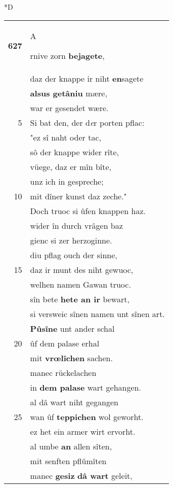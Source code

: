 \documentclass[8pt,a4paper,notitlepage]{article}
\begin{document}
\begin{table}[ht]
\begin{minipage}[t]{0.5\linewidth}
\small
\begin{center}*D
\end{center}
\begin{tabular}{rl}
\textbf{627} & \begin{large}A\end{large}rnive zorn \textbf{bejagete},\\ 
 & daz der knappe ir niht \textbf{en}sagete\\ 
 & \textbf{alsus getâniu} mære,\\ 
 & war er gesendet wære.\\ 
5 & Si bat den, der d\textit{e}r porten pflac:\\ 
 & "ez sî naht oder tac,\\ 
 & sô der knappe wider rîte,\\ 
 & vüege, daz er mîn bîte,\\ 
 & unz ich in gespreche;\\ 
10 & mit dîner kunst daz zeche."\\ 
 & Doch truoc si ûfen knappen haz.\\ 
 & wider în durch vrâgen baz\\ 
 & gienc si zer herzoginne.\\ 
 & diu pflag ouch der sinne,\\ 
15 & daz ir munt des niht gewuoc,\\ 
 & welhen namen Gawan truoc.\\ 
 & sîn bete \textbf{hete an ir} bewart,\\ 
 & si versweic sînen namen unt sînen art.\\ 
 & \textbf{Pûsîne} unt ander schal\\ 
20 & ûf dem palase erhal\\ 
 & mit \textbf{vrœlîchen} sachen.\\ 
 & manec rückelachen\\ 
 & in \textbf{dem palase} wart gehangen.\\ 
 & al dâ wart niht gegangen\\ 
25 & wan ûf \textbf{teppichen} wol geworht.\\ 
 & ez het ein armer wirt ervorht.\\ 
 & al umbe \textbf{an} allen sîten,\\ 
 & mit senften pflûmîten\\ 
 & manec \textbf{gesiz} \textbf{dâ wart} geleit,\\ 

\end{tabular}
\end{minipage}
\end{table}
\end{document}
